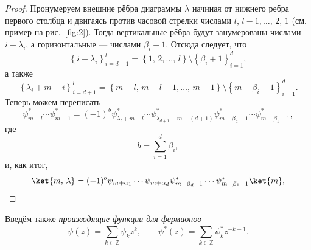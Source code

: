 \documentclass[a4paper,14pt]{extarticle}
\numberwithin{equation}{section}
\begin{document}
\begin{proof}
Пронумеруем внешние рёбра диаграммы $\lambda$  начиная от нижнего ребра первого столбца и двигаясь против часовой стрелки числами $l,\,l-1,\ldots,\,2,\,1$ (см. пример на рис.~\ref{fig:2}).
Тогда вертикальные рёбра будут занумерованы
числами $i-\lambda_i$, а горизонтальные --- числами
$\beta_i+1$. Отсюда следует, что
\begin{equation}\left\{ i-\lambda_i \right\}_{i=d+1}^{l}=
 \left\{ 1,\,2,\ldots,\,l\right\} \setminus
 \left\{ \beta_i +1 \right\} _{i=1}^{d},\end{equation}
а также
\begin{equation}
\left\{\lambda_i+m-i \right\}_{i=d+1}^{l}=
 \left\{ m-l,\,m-l+1,\ldots,\,m-1 \right\} \setminus
 \left\{ m-\beta_i -1 \right\} _{i=1}^{d}
.\end{equation} 
Теперь можем переписать
\begin{equation}
\psi^*_{m-l}\cdots \psi^*_{m-1}=
(-1)^b \psi^*_{\lambda_l+m-l}\cdots \psi^*_{\lambda_{d+1}+m-(d+1)}
\psi_{m-\beta_d-1}^*\cdots \psi_{m-\beta_1-1}^*
,\end{equation} 
где
\begin{equation}
	b= \sum_{i=1}^{d} \beta_i
,\end{equation} 
и, как итог,
\begin{equation}
	\ket{m,\,\lambda}=(-1)^{b}
	\psi_{m+\alpha_{1}}\cdots
	\psi_{m+\alpha_d}\psi^*_{m-\beta_d -1} \cdots \psi_{m-\beta_{1}-1}^* \ket{m}
,\end{equation} 

\end{proof}


\begin{dfn*}
Введём также \emph{производящие функции для фермионов}
\begin{equation}
\psi(z)=\sum _{k\in \mathbb{Z}}^{} \psi_k z^k,\qquad
\psi^* (z)=\sum_{k \in \mathbb{Z}}^{} \psi^*_k z^{-k-1}
.\end{equation} 
\end{dfn*}
\end{document}
